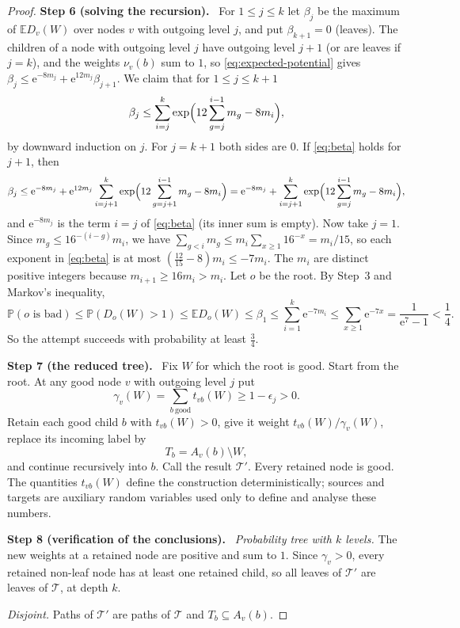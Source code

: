 \documentclass[11pt]{article}
\numberwithin{equation}{section}
\newcommand{\PP}{\mathbb P}
\newcommand{\EE}{\mathbb E}
\newcommand{\TT}{\mathcal T}
\newcommand{\ee}{\mathrm e}
\newcommand{\step}[2]{\par\medskip\noindent\textbf{Step #1 (#2).}\ }
\begin{document}
\begin{proof}
\step{6}{solving the recursion}
For $1\le j\le k$ let $\beta_j$ be the maximum of $\EE D_v(W)$ over
nodes $v$ with outgoing level $j$, and put $\beta_{k+1}=0$ (leaves).
The children of a node with outgoing level $j$ have outgoing level
$j+1$ (or are leaves if $j=k$), and the weights $\nu_v(b)$ sum to $1$,
so \eqref{eq:expected-potential} gives
$\beta_j\le\ee^{-8m_j}+\ee^{12m_j}\beta_{j+1}$. We claim that for
$1\le j\le k+1$
\begin{equation}\label{eq:beta}
 \beta_j\le
 \sum_{i=j}^k
 \exp\Bigl(12\sum_{g=j}^{i-1}m_g-8m_i\Bigr),
\end{equation}
by downward induction on $j$. For $j=k+1$ both sides are $0$. If
\eqref{eq:beta} holds for $j+1$, then
\[
 \beta_j\le\ee^{-8m_j}
 +\ee^{12m_j}\sum_{i=j+1}^k
 \exp\Bigl(12\sum_{g=j+1}^{i-1}m_g-8m_i\Bigr)
 =\ee^{-8m_j}
 +\sum_{i=j+1}^k
 \exp\Bigl(12\sum_{g=j}^{i-1}m_g-8m_i\Bigr),
\]
and $\ee^{-8m_j}$ is the term $i=j$ of \eqref{eq:beta} (its inner sum
is empty). Now take $j=1$. Since
$m_g\le16^{-(i-g)}m_i$, we have
$\sum_{g<i}m_g\le m_i\sum_{x\ge1}16^{-x}=m_i/15$, so each exponent in
\eqref{eq:beta} is at most
$(\frac{12}{15}-8)m_i\le-7m_i$. The $m_i$ are distinct positive
integers because $m_{i+1}\ge16m_i>m_i$. Let $o$ be the root. By Step~3
and Markov's inequality,
\[
 \PP(o\text{ is bad})\le\PP(D_o(W)>1)\le\EE D_o(W)\le\beta_1
 \le\sum_{i=1}^k\ee^{-7m_i}
 \le\sum_{x\ge1}\ee^{-7x}=\frac1{\ee^7-1}<\frac14 .
\]
So the attempt succeeds with probability at least $\frac34$.

\step{7}{the reduced tree}
Fix $W$ for which the root is good. Start from the root. At any good
node $v$ with outgoing level $j$ put
\[
 \gamma_v(W)=\sum_{b\ \mathrm{good}}t_{vb}(W)\ge1-\epsilon_j>0 .
\]
Retain each good child $b$ with $t_{vb}(W)>0$, give it weight
$t_{vb}(W)/\gamma_v(W)$, replace its incoming label by
\[
 T_b=A_v(b)\setminus W,
\]
and continue recursively into $b$. Call the result $\TT'$. Every
retained node is good. The quantities $t_{vb}(W)$ define the
construction deterministically; sources and targets are auxiliary
random variables used only to define and analyse these numbers.

\step{8}{verification of the conclusions}
\emph{Probability tree with $k$ levels.} The new weights at a retained
node are positive and sum to $1$. Since $\gamma_v>0$, every retained
non-leaf node has at least one retained child, so all leaves of $\TT'$
are leaves of $\TT$, at depth $k$.

\emph{Disjoint.} Paths of $\TT'$ are paths of $\TT$ and
$T_b\subseteq A_v(b)$.


\end{proof}
\end{document}
